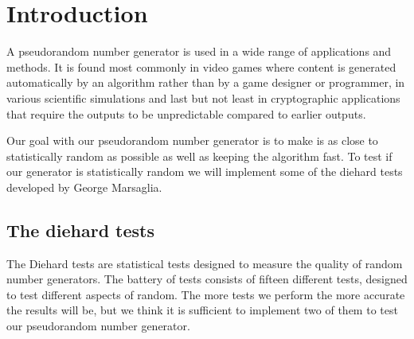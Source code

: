 \section{Introduction}
A pseudorandom number generator is used in a wide range of applications and methods. It is found most commonly in video games where content is generated automatically by an algorithm rather than by a game designer or programmer, in various scientific simulations and last but not least in cryptographic applications that require the outputs to be unpredictable compared to earlier outputs.

Our goal with our pseudorandom number generator is to make is as close to statistically random as possible as well as keeping the algorithm fast. To test if our generator is statistically random we will implement some of the diehard tests developed by George Marsaglia\cite{diehard}\cite{jdiehard}.

\subsection{The diehard tests}
The Diehard tests are statistical tests designed to measure the quality of random number generators. The battery of tests consists of fifteen different tests, designed to test different aspects of random. The more tests we perform the more accurate the results will be, but we think it is sufficient to implement two of them to test our pseudorandom number generator. 
